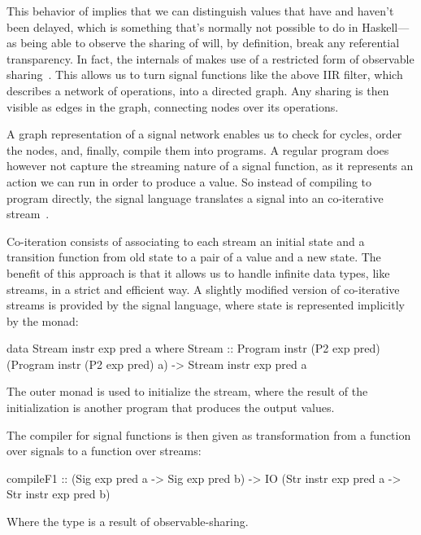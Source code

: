 \documentclass[../paper.tex]{subfiles}
\begin{document}
This behavior of  implies that we can distinguish values that have and haven't been delayed, which is something that's normally not possible to do in Haskell---as being able to observe the sharing of  will, by definition, break any referential transparency. In fact, the internals of  makes use of a restricted form of observable sharing~\cite{claessen1999, gill2009}. This allows us to turn signal functions like the above IIR filter, which describes a network of operations, into a directed graph. Any sharing is then visible as edges in the graph, connecting nodes over its operations.

A graph representation of a signal network enables us to check for cycles, order the nodes, and, finally, compile them into programs. A regular program does however not capture the streaming nature of a signal function, as it represents an action we can run in order to produce a value. So instead of compiling to program directly, the signal language translates a signal into an co-iterative stream~\cite{caspi1998}.

Co-iteration consists of associating to each stream an initial state and a transition function from old state to a pair of a value and a new state. The benefit of this approach is that it allows us to handle infinite data types, like streams, in a strict and efficient way. A slightly modified version of co-iterative streams is provided by the signal language, where state is represented implicitly by the  monad:

\begin{code}
data Stream instr exp pred a where
  Stream :: Program instr (P2 exp pred) (Program instr (P2 exp pred) a)
    -> Stream instr exp pred a
\end{code}

\noindent The outer monad is used to initialize the stream, where the result of the initialization is another program that produces the output values.

The compiler for signal functions is then given as transformation from a function over signals to a function over streams:

\begin{code}
compileF1 :: (Sig exp pred a -> Sig exp pred b)
  -> IO (Str instr exp pred a -> Str instr exp pred b)
\end{code}

\noindent Where the  type is a result of observable-sharing.
\end{document}
